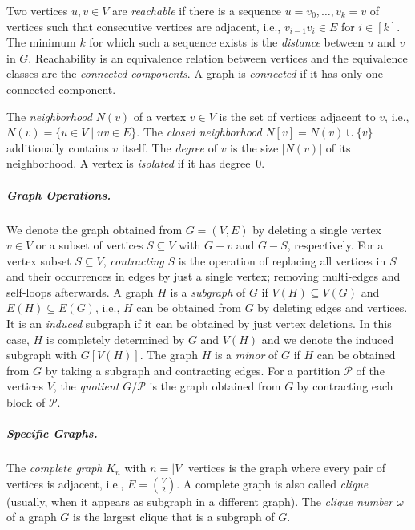 \documentclass[a4paper,english,cleveref,thm-restate]{lipics-v2021}
\begin{document}
Two vertices $u, v \in V$ are \emph{reachable} if there is a sequence $u = v_0, \dots, v_k = v$ of vertices such that consecutive vertices are adjacent, i.e., $v_{i - 1}v_i \in E$ for $i \in [k]$.
The minimum $k$ for which such a sequence exists is the \emph{distance} between $u$ and $v$ in $G$.
Reachability is an equivalence relation between vertices and the equivalence classes are the \emph{connected components}.
A graph is \emph{connected} if it has only one connected component.


The \emph{neighborhood} $N(v)$ of a vertex $v \in V$ is the set of vertices adjacent to $v$, i.e., $N(v) = \{u \in V \mid uv \in E\}$.
The \emph{closed neighborhood} $N[v] = N(v) \cup \{v\}$ additionally contains $v$ itself.
The \emph{degree} of $v$ is the size $|N(v)|$ of its neighborhood.
A vertex is \emph{isolated} if it has degree~$0$.  

\subparagraph{Graph Operations.}

We denote the graph obtained from $G = (V, E)$ by deleting a single vertex $v \in V$ or a subset of vertices $S \subseteq V$ with $G - v$ and $G - S$, respectively.
For a vertex subset $S \subseteq V$, \emph{contracting} $S$ is the operation of replacing all vertices in $S$ and their occurrences in edges by just a single vertex; removing multi-edges and self-loops afterwards.
A graph $H$ is a \emph{subgraph} of $G$ if $V(H) \subseteq V(G)$ and $E(H) \subseteq E(G)$, i.e., $H$ can be obtained from $G$ by deleting edges and vertices.
It is an \emph{induced} subgraph if it can be obtained by just vertex deletions.
In this case, $H$ is completely determined by $G$ and $V(H)$ and we denote the induced subgraph with $G[V(H)]$.
The graph $H$ is a \emph{minor} of $G$ if $H$ can be obtained from $G$ by taking a subgraph and contracting edges.
For a partition $\mathcal P$ of the vertices $V$, the \emph{quotient} $G / \mathcal P$ is the graph obtained from $G$ by contracting each block of $\mathcal P$.


\subparagraph{Specific Graphs.}

The \emph{complete graph} $K_n$ with $n = |V|$ vertices is the graph where every pair of vertices is adjacent, i.e., $E = \binom{V}{2}$.
A complete graph is also called \emph{clique} (usually, when it appears as subgraph in a different graph).
The \emph{clique number} $\omega$ of a graph $G$ is the largest clique that is a subgraph of $G$.
\end{document}

